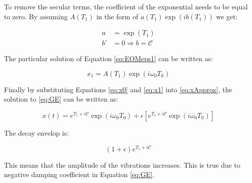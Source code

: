\documentclass[14pt, a4paper]{extreport}
\begin{document}
To remove the secular terms, the coefficient of the exponential needs to be equal to zero. By assuming $A(T_1)$ in the form of $a(T_1) \exp (ib(T_1))$ we get:

%
\begin{subequations}
\begin{align*}
	a &= \exp\left( T_1 \right) \\
	b' &= 0 \Rightarrow b = \mathcal{C}
\end{align*}
\end{subequations}
%

The particular solution of Equation \eqref{eq:EOMeps1} can be written as:

%
\begin{equation}\label{eq:x1}
	x_1 = A(T_1) \exp \left( i\omega_0 T_0 \right)
\end{equation}
%

Finally by substituting Equations \eqref{eq:x0} and \eqref{eq:x1} into \eqref{eq:xApprox}, the solution to \eqref{eq:GE} can be written as:

%
\begin{equation}
	x(t) = e^{T_1 + i\mathcal{C}} \exp \left( i\omega_0 T_0 \right) + 
	       \epsilon
	       \left[
	       e^{T_1 + i\mathcal{C}} \exp \left( i\omega_0 T_0 \right)
	       \right]
\end{equation}
% 

The decay envelop is:

%
\begin{equation}
	\left( 1 + \epsilon \right) e^{T_1 + i\mathcal{C}}
\end{equation}
%

This means that the amplitude of the vibrations increases. This is true due to negative damping coefficient in Equation \eqref{eq:GE}.
\end{document}
